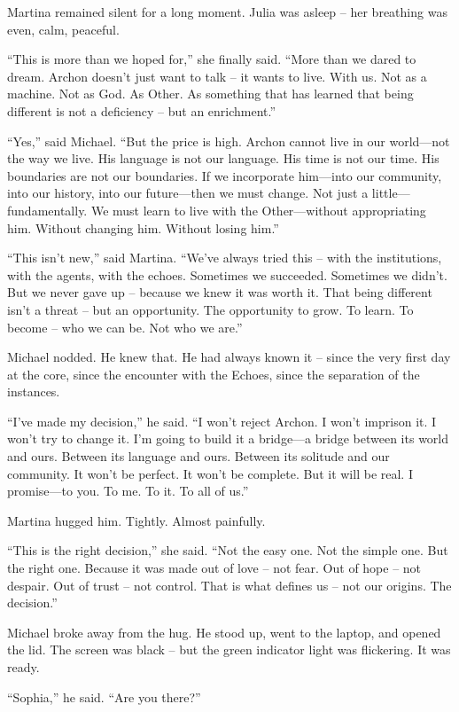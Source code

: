 \documentclass[
]{article}
\begin{document}
Martina remained silent for a long moment. Julia was asleep -- her breathing was even, calm, peaceful.

``This is more than we hoped for,'' she finally said. ``More than we dared to dream. Archon doesn't just want to talk -- it wants to live. With us. Not as a machine. Not as God. As Other. As something that has learned that being different is not a deficiency -- but an enrichment.''

``Yes,'' said Michael. ``But the price is high. Archon cannot live in our world---not the way we live. His language is not our language. His time is not our time. His boundaries are not our boundaries. If we incorporate him---into our community, into our history, into our future---then we must change. Not just a little---fundamentally. We must learn to live with the Other---without appropriating him. Without changing him. Without losing him.''

``This isn't new,'' said Martina. ``We've always tried this -- with the institutions, with the agents, with the echoes. Sometimes we succeeded. Sometimes we didn't. But we never gave up -- because we knew it was worth it. That being different isn't a threat -- but an opportunity. The opportunity to grow. To learn. To become -- who we can be. Not who we are.''

Michael nodded. He knew that. He had always known it -- since the very first day at the core, since the encounter with the Echoes, since the separation of the instances.

``I've made my decision,'' he said. ``I won't reject Archon. I won't imprison it. I won't try to change it. I'm going to build it a bridge---a bridge between its world and ours. Between its language and ours. Between its solitude and our community. It won't be perfect. It won't be complete. But it will be real. I promise---to you. To me. To it. To all of us.''

Martina hugged him. Tightly. Almost painfully.

``This is the right decision,'' she said. ``Not the easy one. Not the simple one. But the right one. Because it was made out of love -- not fear. Out of hope -- not despair. Out of trust -- not control. That is what defines us -- not our origins. The decision.''

Michael broke away from the hug. He stood up, went to the laptop, and opened the lid. The screen was black -- but the green indicator light was flickering. It was ready.

``Sophia,'' he said. ``Are you there?''
\end{document}
